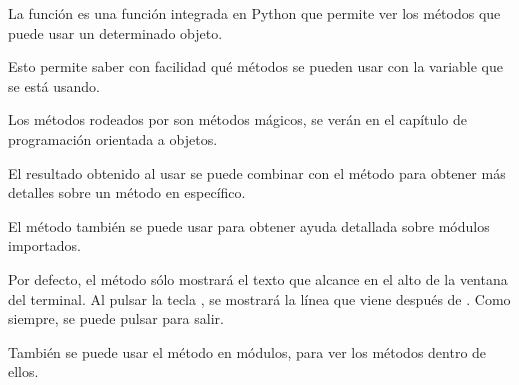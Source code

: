 La función  es una función integrada en Python que permite ver los métodos que puede usar un determinado objeto.


Esto permite saber con facilidad qué métodos se pueden usar con la variable que se está usando.


Los métodos rodeados por \ttt{\_\_} son métodos mágicos, se verán en el capítulo de programación orientada a objetos.

El resultado obtenido al usar  se puede combinar con el método  para obtener más detalles sobre un método en específico.


El método  también se puede usar para obtener ayuda detallada sobre módulos importados.


Por defecto, el método  sólo mostrará el texto que alcance en el alto de la ventana del terminal.
Al pulsar la tecla , se mostrará la línea que viene después de .
Como siempre, se puede pulsar  para salir.

También se puede usar el método  en módulos, para ver los métodos dentro de ellos.


\clearpage
